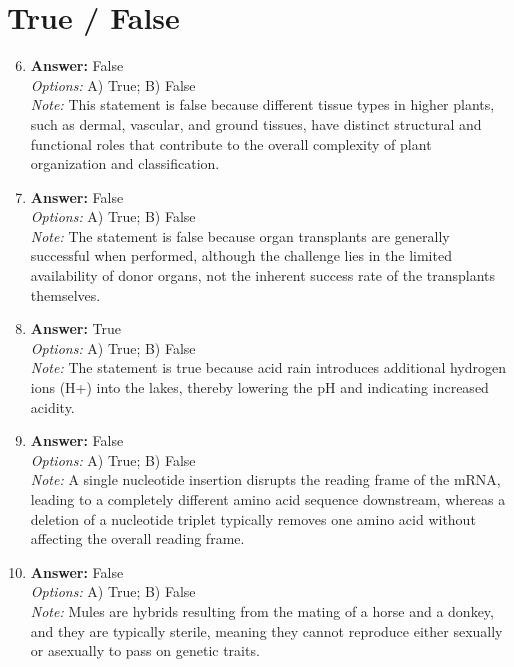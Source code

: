 \documentclass[12pt]{article}
\begin{document}
\section*{True / False}
\begin{enumerate}[label=\arabic*.]
\setcounter{enumi}{5}
\item \textbf{Answer:} False
\\ \textit{Options:} A) True; B) False
\\ \textit{Note:} This statement is false because different tissue types in higher plants, such as dermal, vascular, and ground tissues, have distinct structural and functional roles that contribute to the overall complexity of plant organization and classification.
\item \textbf{Answer:} False
\\ \textit{Options:} A) True; B) False
\\ \textit{Note:} The statement is false because organ transplants are generally successful when performed, although the challenge lies in the limited availability of donor organs, not the inherent success rate of the transplants themselves.
\item \textbf{Answer:} True
\\ \textit{Options:} A) True; B) False
\\ \textit{Note:} The statement is true because acid rain introduces additional hydrogen ions (H+) into the lakes, thereby lowering the pH and indicating increased acidity.
\item \textbf{Answer:} False
\\ \textit{Options:} A) True; B) False
\\ \textit{Note:} A single nucleotide insertion disrupts the reading frame of the mRNA, leading to a completely different amino acid sequence downstream, whereas a deletion of a nucleotide triplet typically removes one amino acid without affecting the overall reading frame.
\item \textbf{Answer:} False
\\ \textit{Options:} A) True; B) False
\\ \textit{Note:} Mules are hybrids resulting from the mating of a horse and a donkey, and they are typically sterile, meaning they cannot reproduce either sexually or asexually to pass on genetic traits.
\end{enumerate}
\end{document}
